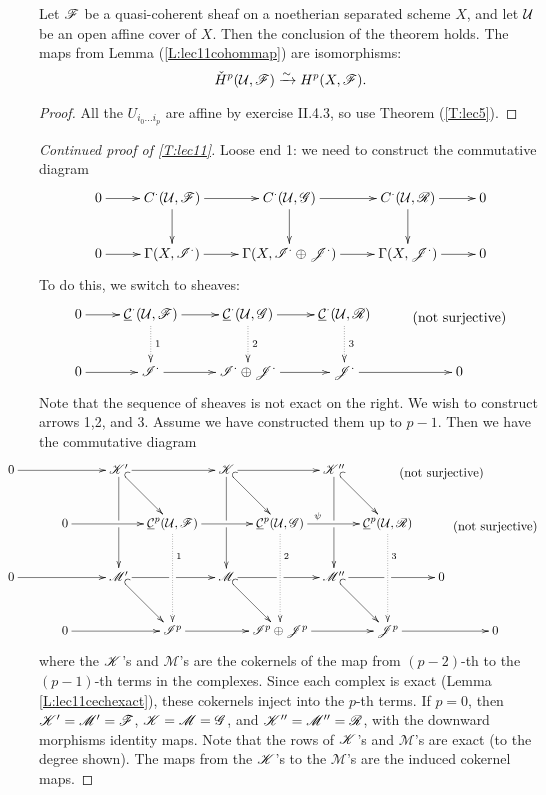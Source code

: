  \setcounter{lecture}{12}

\begin{corollary} Let $\mathscr{F}$ be a
quasi-coherent sheaf on a noetherian separated scheme $X$, and let
$\mathcal{U}$ be an open affine cover of $X$.  Then the conclusion of the
theorem holds.  The maps from Lemma (\ref{L:lec11cohommap}) are
isomorphisms:
\[
    \check H^p(\mathcal{U},\mathscr{F}) \xrightarrow{\sim} H^p(X,\mathscr{F}).
\]
\end{corollary}
\begin{proof}
All the $U_{i_0\dots i_p}$ are affine by exercise II.4.3, so use
Theorem (\ref{T:lec5}). 
\end{proof}

\begin{proof}[Continued proof of \ref{T:lec11}] \def\M{\mathscr{M}}
Loose end 1: we need to construct the commutative diagram
\begin{equation}\label{D:lec12loose}\xymatrix{
 0\ar[r] & C^{\cdot}(\U,\F)\ar[r] \ar[d] & C^{\cdot}(\U,\G) \ar[r] \ar[d] &
 C^{\cdot}(\U,\R) \ar[r] \ar[d] & 0\\
 0\ar[r] & \Gamma(X,\I^{\cdot}) \ar[r] & \Gamma(X,\I^{\cdot}\oplus
 \J^{\cdot}) \ar[r] & \Gamma(X,\J^{\cdot}) \ar[r] & 0
}\end{equation}
 To do this, we switch to sheaves:
\[\xymatrix{
 0\ar[r] & \C^{\cdot}(\U,\F)\ar[r] \ar@{.>}[d]^1 & \C^{\cdot}(\U,\G) \ar[r] \ar@{.>}[d]^2 &
 \C^{\cdot}(\U,\R) \ar@{.>}[d]^3 & \txt{(not surjective)}\\
 0\ar[r] & \I^{\cdot} \ar[r] & \I^{\cdot}\oplus
 \J^{\cdot} \ar[r] & \J^{\cdot} \ar[r] & 0
}\]
 Note that the sequence of sheaves is not exact on the right.  We wish
 to construct arrows 1,2, and 3.  Assume we have
 constructed them up to $p-1$.  Then we have the commutative diagram
 \[\hspace{-1cm} \xymatrix@!0 @C=15mm @R=15mm {
  0\ar[rr] &    & \K'\ar[rr]\ar@{^(->}[dr]\ar[dd]|\hole &
    & \K\ar[rr]\ar@{^(->}[dr]\ar[dd]|\hole  &
    & \K''\ar@{^(->}[dr] \ar[dd]|\hole &    &  \txt{(not surjective)} \\
    & 0\ar[rr]  &
    & \C^p(\U,\F) \ar[rr] \ar@{.>}[dd]^(.3)1 &
    & \C^p(\U,\G) \ar[rr]^(.35){\psi} \ar@{.>}[dd]^(.3)2 &
    & \C^p(\U,\R)  \ar@{.>}[dd]^(.3)3 &   &  \txt{(not surjective)} \\
  0\ar[rr] &
    & \M'\ar[rr]|\hole \ar@{^(->}[dr] &
    & \M\ar[rr]|\hole \ar@{^(->}[dr]  &
    & \M''\ar[rr]|\hole \ar@{^(->}[dr] &    &  0 \\
    & 0\ar[rr]  &
    & \I^p \ar[rr] &
    & \I^p \oplus \J^p \ar[rr] &
    & \J^p \ar[rr] &   & 0
 }\]
 where the $\mathscr{K}$'s and $\M$'s are the cokernels of the map from
 $(p-2)$-th to the $(p-1)$-th terms in the complexes.  Since each
 complex is exact (Lemma \ref{L:lec11cechexact}), these cokernels
 inject into the $p$-th terms.  If $p=0$, then $\K'=\M'=\F$,
 $\K=\M=\G$, and $\K''=\M''=\R$, with the downward morphisms
 identity maps.  Note that the rows of $\mathscr{K}$'s and $\M$'s are
 exact (to the degree shown).  The maps from
 the $\mathscr{K}$'s to the $\M$'s are the induced cokernel maps.


\end{proof}
